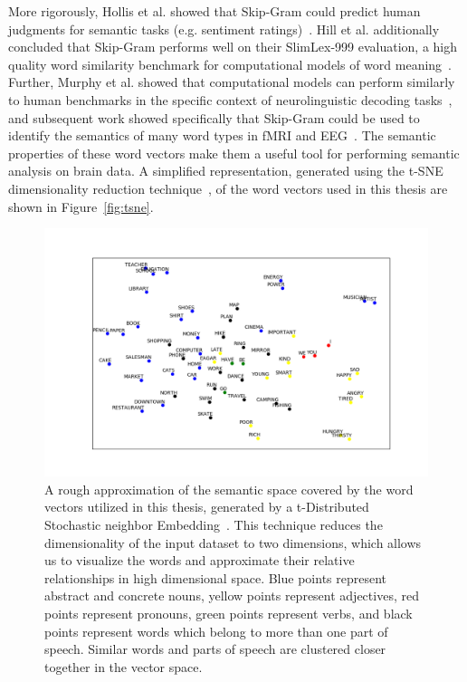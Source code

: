 More rigorously, Hollis et al. showed that Skip-Gram could predict human 
judgments for semantic tasks (e.g. sentiment 
ratings)~\cite{hollis2017extrapolating}.  Hill et al.  additionally concluded 
that Skip-Gram performs well on their SlimLex-999 evaluation, a high quality 
word similarity benchmark for computational models of word 
meaning~\cite{hill2016simlex}. Further, Murphy et al. showed that computational 
models can perform similarly to human benchmarks in the specific context of 
neurolinguistic decoding tasks~\cite{Murphy2012}, and subsequent work showed 
specifically that Skip-Gram could be used to identify the semantics of many 
word types in fMRI and EEG~\cite{xu2016brainbench}. The semantic properties of 
these word vectors make them a useful tool for performing semantic analysis on 
brain data. A simplified representation, generated using the t-SNE 
dimensionality reduction technique~\cite{maaten2008visualizing}, of the word 
vectors used in this thesis are shown in Figure~\ref{fig:tsne}.

\begin{figure}[t]
 \centerline{
   \includegraphics[width=\linewidth]{figures/tsne}
 }
 \caption[Visualization of Utilized Word Vectors]{
   A rough approximation of the semantic space covered by the word vectors 
   utilized in this thesis, generated by a t-Distributed Stochastic neighbor 
   Embedding~\cite{maaten2008visualizing}.  This technique reduces the 
   dimensionality of the input dataset to two dimensions, which allows us to 
   visualize the words and approximate their relative relationships in high 
   dimensional space. Blue points represent abstract and concrete nouns, yellow 
   points represent adjectives, red points represent pronouns, green points 
   represent verbs, and black points represent words which belong to more than 
   one part of speech. Similar words and parts of speech are clustered closer 
   together in the vector space.
 }
 \label{fig:selection}
\end{figure}

